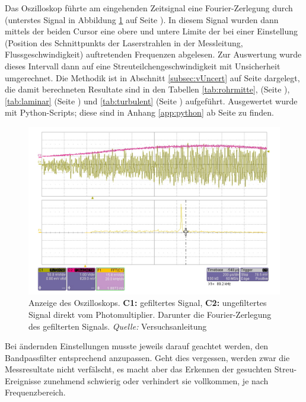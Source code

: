 Das  Oszilloskop f\"uhrte  am  eingehenden  Zeitsignal eine  Fourier-Zerlegung
durch  (unterstes   Signal  in  Abbildung  \ref{fig:oszi:display}   auf  Seite
\pageref{fig:oszi:display}  ).  In  diesem  Signal  wurden  dann  mittels  der
beiden  Cursor  eine  obere  und  untere  Limite  der  bei  einer  Einstellung
(Position   des   Schnittpunkts   der  Laserstrahlen   in   der   Messleitung,
Flussgeschwindigkeit) auftretenden Frequenzen  abgelesen. Zur Auswertung wurde
dieses Intervall  dann auf eine Streuteilchengeschwindigkeit  mit Unsicherheit
umgerechnet. Die  Methodik ist  in  Abschnitt  \ref{subsec:vUncert} auf  Seite
\pageref{subsec:vUncert}  dargelegt,  die  damit  berechneten  Resultate  sind
in   den   Tabellen  \ref{tab:rohrmitte},   (Seite   \pageref{tab:rohrmitte}),
\ref{tab:laminar} (Seite \pageref{tab:laminar}) und \ref{tab:turbulent} (Seite
\pageref{tab:turbulent})  aufgef\"uhrt. Ausgewertet wurde  mit Python-Scripts;
diese sind in Anhang \ref{app:python} ab Seite \pageref{app:python} zu finden.


\begin{figure}[h!t]
    \centering
    \includegraphics[width=.7\textwidth]{images/mess-signal.png}
    \caption{%
        Anzeige      des      Oszilloskops.      \textbf{C1:}      gefiltertes
        Signal,     \textbf{C2:}    ungefiltertes     Signal    direkt     vom
        Photomultiplier. Darunter   die   Fourier-Zerlegung  des   gefilterten
        Signals. \emph{Quelle:} Versuchsanleitung
    }
    \label{fig:oszi:display}
\end{figure}

Bei  \"andernden  Einstellungen musste  jeweils  darauf  geachtet werden,  den
Bandpassfilter entsprechend  anzupassen. Geht dies vergessen, werden  zwar die
Messresultate nicht  verf\"alscht, es  macht aber  das Erkennen  der gesuchten
Streu-Ereignisse zunehmend  schwierig oder verhindert sie  vollkommen, je nach
Frequenzbereich.


